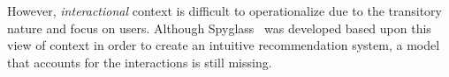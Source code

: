 
However, \textit{interactional} context is difficult to operationalize due to the transitory nature and focus on users. Although Spyglass~\cite{Viriyakattiyaporn:2010} was developed based upon this view of context in order to create an intuitive recommendation system, a model that accounts for the interactions is still missing.


